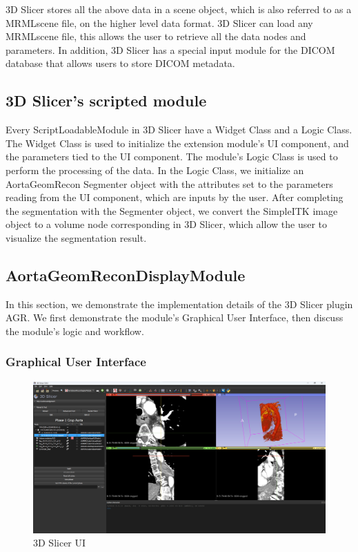 3D Slicer stores all the above data in a scene object, which is also referred to as a MRMLscene file, on the higher level data format. 3D Slicer can load any MRMLscene file, this allows the user to retrieve all the data nodes and parameters. In addition, 3D Slicer has a special input module for the DICOM database that allows users to store DICOM metadata.

\subsection{3D Slicer's scripted module}

Every ScriptLoadableModule in 3D Slicer have a Widget Class and a Logic Class. The Widget Class is used to initialize the extension module's UI component, and the parameters tied to the UI component. The module's Logic Class is used to perform the processing of the data. In the Logic Class, we initialize an AortaGeomRecon Segmenter object with the attributes set to the parameters reading from the UI component, which are inputs by the user. After completing the segmentation with the Segmenter object, we convert the SimpleITK image object to a volume node corresponding in 3D Slicer, which allow the user to visualize the segmentation result. 

\subsection{AortaGeomReconDisplayModule}

In this section, we demonstrate the implementation details of the 3D Slicer plugin AGR. We first demonstrate the module's Graphical User Interface, then discuss the module's logic and workflow.

\subsubsection{Graphical User Interface}\label{GUI}

\begin{figure}[H]
    \centering
    \includegraphics[width=\textwidth]{figures/AGR/Slicer_UI.png}
    \caption[3D Slicer UI]{3D Slicer UI}
    \label{fig_slicer_ui}
\end{figure}

